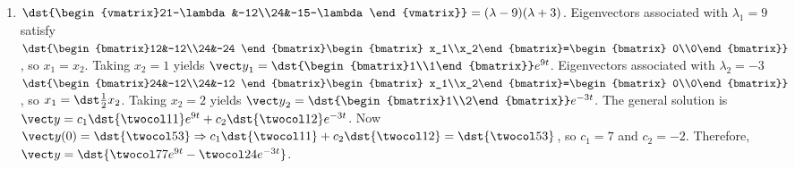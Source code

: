 \documentclass[openany]{book}
\newenvironment{sectionSolutions}{
 \begin{enumerate}[item-label={\thesection.\arabic{enumi}.}]
}{
 \end{enumerate}
}
\begin{document}
\begin{sectionSolutions}
\item
$\dst{\begin{vmatrix}21-\lambda&-12\\24&-15-\lambda\end{vmatrix}}
=(\lambda-9)(\lambda+3)$.
Eigenvectors  associated with $\lambda_1=9$  satisfy
$\dst{\begin{bmatrix}12&-12\\24&-24
\end{bmatrix}\begin{bmatrix}
x_1\\x_2\end{bmatrix}=\begin{bmatrix} 0\\0\end{bmatrix}}$,
so $x_1=x_2$.  Taking $x_2=1$ yields
${\vect y}_1=\dst{\begin{bmatrix}1\\1\end{bmatrix}}e^{9t}$.
Eigenvectors  associated with $\lambda_2=-3$
$\dst{\begin{bmatrix}24&-12\\24&-12
\end{bmatrix}\begin{bmatrix}
x_1\\x_2\end{bmatrix}=\begin{bmatrix} 0\\0\end{bmatrix}}$,
so $x_1=\dst\frac{1}{2}x_2$.  Taking $x_2=2$ yields
${\vect y}_2=\dst{\begin{bmatrix}1\\2\end{bmatrix}}e^{-3t}$.
The general solution is
${\vect y}=c_1\dst{\twocol11}e^{9t}+c_2\dst{\twocol12}e^{-3t}$.
Now  ${\vect y}(0)=\dst{\twocol53}\Rightarrow
c_1\dst{\twocol11}+c_2\dst{\twocol12}=\dst{\twocol53}$, so $c_1=7$
and $c_2=-2$. Therefore,
${\vect y}=\dst{\twocol77e^{9t}-\twocol24e^{-3t}}$.



\end{sectionSolutions}
\end{document}
